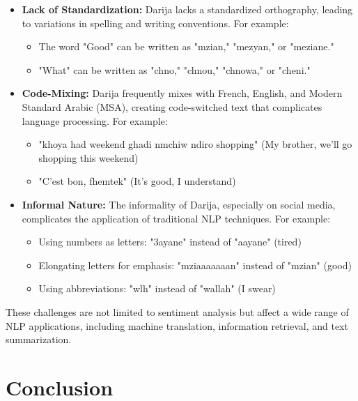 \documentclass[a4paper,40pt,twocolumn]{article}
\begin{document}
\begin{itemize}
    \item \textbf{Lack of Standardization:} Darija lacks a standardized orthography, leading to variations in spelling and writing conventions. For example:
    \begin{itemize}
        \item The word "Good" can be written as "mzian," "mezyan," or "meziane."
        \item "What" can be written as "chno," "chnou," "chnowa," or "cheni."
    \end{itemize}

    \item \textbf{Code-Mixing:} Darija frequently mixes with French, English, and Modern Standard Arabic (MSA), creating code-switched text that complicates language processing. For example:
    \begin{itemize}
        \item "khoya had weekend ghadi nmchiw ndiro shopping" (My brother, we’ll go shopping this weekend)
        \item "C'est bon, fhemtek" (It's good, I understand)
    \end{itemize}

    \item \textbf{Informal Nature:} The informality of Darija, especially on social media, complicates the application of traditional NLP techniques. For example:
    \begin{itemize}
        \item Using numbers as letters: "3ayane" instead of "aayane" (tired)
        \item Elongating letters for emphasis: "mziaaaaaaan" instead of "mzian" (good)
        \item Using abbreviations: "wlh" instead of "wallah" (I swear)
    \end{itemize}
\end{itemize}

These challenges are not limited to sentiment analysis but affect a wide range of NLP applications, including machine translation, information retrieval, and text summarization.

\section{Conclusion}
\end{document}
